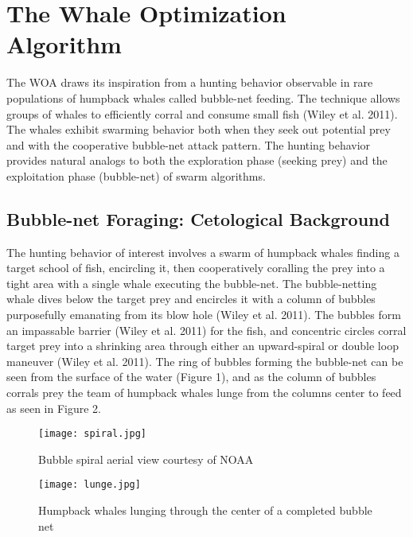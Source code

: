 \documentclass[11pt]{article}
\begin{document}
\section*{The Whale Optimization Algorithm} {
    The WOA draws its inspiration from a hunting behavior observable in rare populations of humpback whales called bubble-net feeding.
    The technique allows groups of whales to efficiently corral and consume small fish (Wiley et al. 2011).
    The whales exhibit swarming behavior both when they seek out potential prey and with the cooperative bubble-net attack pattern.
    The hunting behavior provides natural analogs to both the exploration phase (seeking prey) and the exploitation phase (bubble-net) of swarm algorithms.
}

\subsection*{Bubble-net Foraging: Cetological Background} {
    The hunting behavior of interest involves a swarm of humpback whales finding a target school of fish, encircling it, then cooperatively coralling the prey into a tight area with a single whale executing the bubble-net.
    The bubble-netting whale dives below the target prey and encircles it with a column of bubbles purposefully emanating from its blow hole (Wiley et al. 2011).
    The bubbles form an impassable barrier (Wiley et al. 2011) for the fish, and concentric circles corral target prey into a shrinking area through either an upward-spiral or double loop maneuver (Wiley et al. 2011).
    The ring of bubbles forming the bubble-net can be seen from the surface of the water (Figure 1), and as the column of bubbles corrals prey the team of humpback whales lunge from the columns center to feed as seen in Figure 2.

    \begin{figure}[h]
        \centering
        \caption{Bubble spiral aerial view courtesy of NOAA}
        \texttt{[image: spiral.jpg]}
    \end{figure}

    \begin{figure}[h]
        \centering
        \caption{Humpback whales lunging through the center of a completed bubble net}
        \texttt{[image: lunge.jpg]}
    \end{figure}
}
\end{document}
